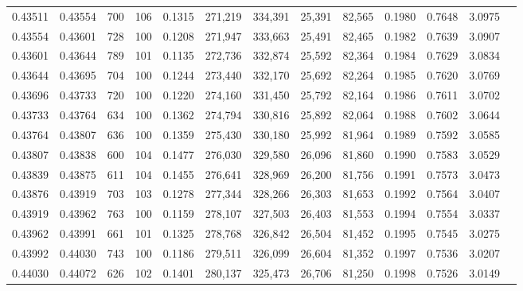 \begin{tabular}{rrrrrrrrrrrrr}
0.43511 & 0.43554 &   700 & 106 &                                     0.1315 & 271,219 & 334,391 &  25,391 &  82,565 & 0.1980 & 0.7648 & 3.0975 \\
0.43554 & 0.43601 &   728 & 100 &                                     0.1208 & 271,947 & 333,663 &  25,491 &  82,465 & 0.1982 & 0.7639 & 3.0907 \\
0.43601 & 0.43644 &   789 & 101 &                                     0.1135 & 272,736 & 332,874 &  25,592 &  82,364 & 0.1984 & 0.7629 & 3.0834 \\
0.43644 & 0.43695 &   704 & 100 &                                     0.1244 & 273,440 & 332,170 &  25,692 &  82,264 & 0.1985 & 0.7620 & 3.0769 \\
0.43696 & 0.43733 &   720 & 100 &                                     0.1220 & 274,160 & 331,450 &  25,792 &  82,164 & 0.1986 & 0.7611 & 3.0702 \\
0.43733 & 0.43764 &   634 & 100 &                                     0.1362 & 274,794 & 330,816 &  25,892 &  82,064 & 0.1988 & 0.7602 & 3.0644 \\
0.43764 & 0.43807 &   636 & 100 &                                     0.1359 & 275,430 & 330,180 &  25,992 &  81,964 & 0.1989 & 0.7592 & 3.0585 \\
0.43807 & 0.43838 &   600 & 104 &                                     0.1477 & 276,030 & 329,580 &  26,096 &  81,860 & 0.1990 & 0.7583 & 3.0529 \\
0.43839 & 0.43875 &   611 & 104 &                                     0.1455 & 276,641 & 328,969 &  26,200 &  81,756 & 0.1991 & 0.7573 & 3.0473 \\
0.43876 & 0.43919 &   703 & 103 &                                     0.1278 & 277,344 & 328,266 &  26,303 &  81,653 & 0.1992 & 0.7564 & 3.0407 \\
0.43919 & 0.43962 &   763 & 100 &                                     0.1159 & 278,107 & 327,503 &  26,403 &  81,553 & 0.1994 & 0.7554 & 3.0337 \\
0.43962 & 0.43991 &   661 & 101 &                                     0.1325 & 278,768 & 326,842 &  26,504 &  81,452 & 0.1995 & 0.7545 & 3.0275 \\
0.43992 & 0.44030 &   743 & 100 &                                     0.1186 & 279,511 & 326,099 &  26,604 &  81,352 & 0.1997 & 0.7536 & 3.0207 \\
0.44030 & 0.44072 &   626 & 102 &                                     0.1401 & 280,137 & 325,473 &  26,706 &  81,250 & 0.1998 & 0.7526 & 3.0149 \\

\end{tabular}
